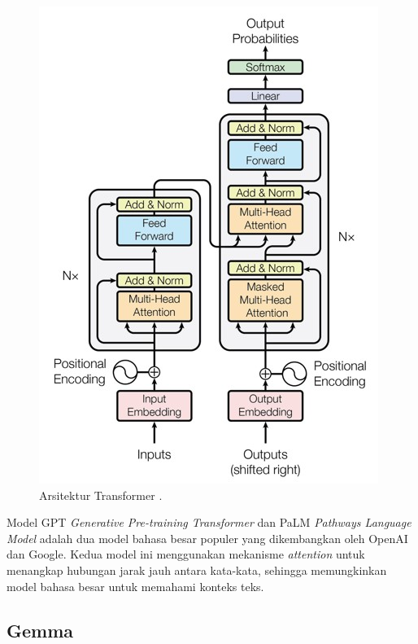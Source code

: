 \begin{figure}[H]
  \centering

  \includegraphics[scale=0.8]{gambar/transformer.jpg}

  \caption{Arsitektur Transformer \parencite{vaswani2023attention}.}
\end{figure}

Model GPT \textit{Generative Pre-training Transformer} dan PaLM \textit{Pathways Language Model} adalah dua model bahasa besar populer yang dikembangkan oleh OpenAI dan Google. Kedua model ini menggunakan mekanisme \textit{attention} untuk menangkap hubungan jarak jauh antara kata-kata, sehingga memungkinkan model bahasa besar untuk memahami konteks teks.

\subsection{Gemma}

